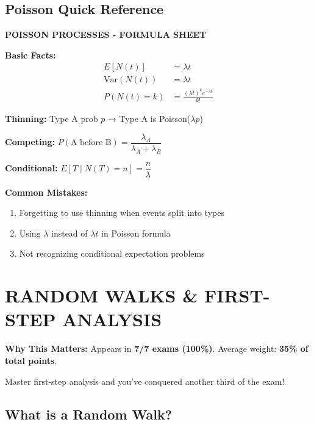 \documentclass[10pt,letterpaper]{article}
\begin{document}
\subsection{Poisson Quick Reference}

\begin{formulabox}
\textbf{POISSON PROCESSES - FORMULA SHEET}

\vspace{0.2cm}

\textbf{Basic Facts:}
\begin{align*}
E[N(t)] &= \lambda t \\
\text{Var}(N(t)) &= \lambda t \\
P(N(t) = k) &= \frac{(\lambda t)^k e^{-\lambda t}}{k!}
\end{align*}

\textbf{Thinning:} Type A prob $p$ → Type A is Poisson($\lambda p$)

\textbf{Competing:} $P(\text{A before B}) = \dfrac{\lambda_A}{\lambda_A + \lambda_B}$

\textbf{Conditional:} $E[T \mid N(T) = n] = \dfrac{n}{\lambda}$
\end{formulabox}

\begin{warningbox}
\textbf{Common Mistakes:}
\begin{enumerate}
  \item Forgetting to use thinning when events split into types
  \item Using $\lambda$ instead of $\lambda t$ in Poisson formula
  \item Not recognizing conditional expectation problems
\end{enumerate}
\end{warningbox}

\newpage

\section{RANDOM WALKS \& FIRST-STEP ANALYSIS}

\begin{criticalbox}
\textbf{Why This Matters:} Appears in \textbf{7/7 exams (100\%)}. Average weight: \textbf{35\% of total points}.

Master first-step analysis and you've conquered another third of the exam!
\end{criticalbox}

\subsection{What is a Random Walk?}
\end{document}
